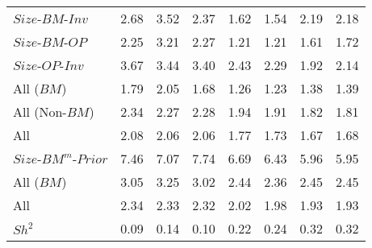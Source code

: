 \begin{table}[!ht]
\begin{tabular}{lrrrrrrr}
    $Size$-$BM$-$Inv$  & 2.68  & 3.52  & 2.37  & 1.62  & 1.54  & 2.19  & 2.18  \\
  
    $Size$-$BM$-$OP$  & 2.25  & 3.21  & 2.27  & 1.21  & 1.21  & 1.61  & 1.72  \\
  
    $Size$-$OP$-$Inv$  & 3.67  & 3.44  & 3.40  & 2.43  & 2.29  & 1.92  & 2.14  \\
  [1em]
    All ($BM$)  & 1.79  & 2.05  & 1.68  & 1.26  & 1.23  & 1.38  & 1.39  \\
  
    All (Non-$BM$)  & 2.34  & 2.27  & 2.28  & 1.94  & 1.91  & 1.82  & 1.81  \\
  
    All  & 2.08  & 2.06  & 2.06  & 1.77  & 1.73  & 1.67  & 1.68  \\
  [1em]
    $Size$-$BM^m$-$Prior$  & 7.46  & 7.07  & 7.74  & 6.69  & 6.43  & 5.96  & 5.95  \\
  [1em]
    All ($BM$)  & 3.05  & 3.25  & 3.02  & 2.44  & 2.36  & 2.45  & 2.45  \\
  
    All  & 2.34  & 2.33  & 2.32  & 2.02  & 1.98  & 1.93  & 1.93  \\
  [1em]
    $Sh^2$  & 0.09  & 0.14  & 0.10  & 0.22  & 0.24  & 0.32  & 0.32  \\
  
  \bottomrule
\end{tabular}
\label{tbl:GRS}
\end{table}